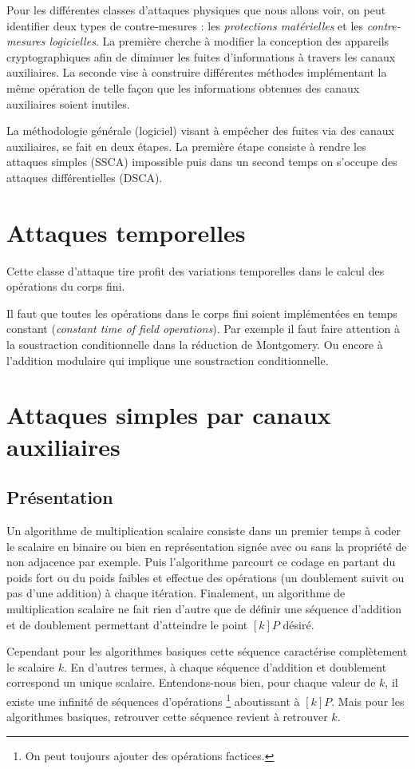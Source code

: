 Pour les différentes classes d'attaques physiques que nous allons voir, on peut identifier deux types de contre-mesures : les \emph{protections matérielles} et les \emph{contre-mesures logicielles}. La première cherche à modifier la conception des appareils cryptographiques afin  de diminuer les fuites d'informations à travers les canaux auxiliaires. La seconde vise à construire différentes méthodes implémentant la même opération de telle façon que les informations obtenues des canaux auxiliaires soient inutiles. 

La méthodologie générale (logiciel) visant à empêcher des fuites via des canaux auxiliaires, se fait en deux étapes. La première étape consiste à rendre les attaques simples (SSCA) impossible puis dans un second temps on s'occupe des attaques différentielles (DSCA).

\section{Attaques temporelles}
Cette classe d'attaque tire profit des variations temporelles dans le calcul des opérations du corps fini. 

Il faut que toutes les opérations dans le corps fini soient implémentées en temps constant (\emph{constant time of field operations}). Par exemple il faut faire attention à la soustraction conditionnelle dans la réduction de Montgomery. Ou encore à l'addition modulaire qui implique une soustraction conditionnelle. 

\section{Attaques simples par canaux auxiliaires}
\subsection{Présentation}
Un algorithme de multiplication scalaire consiste dans un premier temps à coder le scalaire en binaire ou bien en représentation signée avec ou sans la propriété de non adjacence par exemple. Puis l'algorithme parcourt ce codage en partant du poids fort ou du poids faibles et effectue des opérations (un doublement suivit ou pas d'une addition) à chaque itération. Finalement, un algorithme de multiplication scalaire ne fait rien d'autre que de définir une séquence d'addition et de doublement permettant d'atteindre le point $[k]P$ désiré.

Cependant pour les algorithmes basiques cette séquence caractérise complètement le scalaire $k$. En d'autres termes, à chaque séquence d'addition et doublement correspond un unique scalaire. Entendons-nous bien, pour chaque valeur de $k$, il existe une infinité de séquences d'opérations \footnote{On peut toujours ajouter des opérations factices.} aboutissant à $[k]P$. Mais pour les algorithmes basiques, retrouver cette séquence revient à retrouver $k$. 

